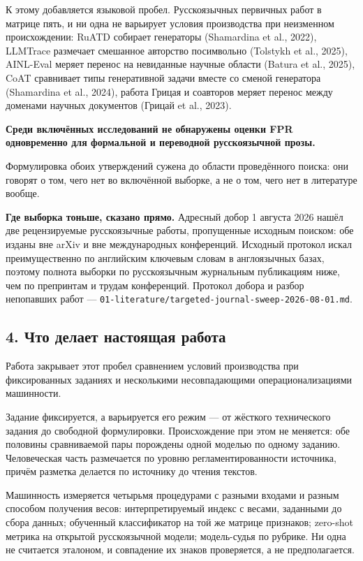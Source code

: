 \documentclass[11pt,a4paper]{article}
\renewcommand{\_}{\textunderscore\allowbreak}
\begin{document}
К этому добавляется языковой пробел. Русскоязычных первичных работ в матрице пять,
и ни одна не варьирует условия производства при неизменном происхождении: RuATD
собирает генераторы (Shamardina et al., 2022), LLMTrace размечает смешанное авторство посимвольно
(Tolstykh et al., 2025), AINL-Eval меряет перенос на невиданные научные области (Batura et al., 2025), CoAT
сравнивает типы генеративной задачи вместе со сменой генератора (Shamardina et al., 2024), работа
Грицая и соавторов меряет перенос между доменами научных документов (Грицай et al., 2023).

\textbf{Среди включённых исследований не обнаружены оценки FPR одновременно для
формальной и переводной русскоязычной прозы.}

Формулировка обоих утверждений сужена до области проведённого поиска: они говорят
о том, чего нет во включённой выборке, а не о том, чего нет в литературе вообще.

\textbf{Где выборка тоньше, сказано прямо.} Адресный добор 1 августа 2026 нашёл две
рецензируемые русскоязычные работы, пропущенные исходным поиском: обе изданы вне
arXiv и вне международных конференций. Исходный протокол искал преимущественно по
английским ключевым словам в англоязычных базах, поэтому полнота выборки по
русскоязычным журнальным публикациям ниже, чем по препринтам и трудам конференций.
Протокол добора и разбор непопавших работ — \texttt{01-\allowbreak{}literature/targeted-\allowbreak{}journal-\allowbreak{}sweep-\allowbreak{}2026-\allowbreak{}08-\allowbreak{}01.md}.

\subsection{4. Что делает настоящая работа}

Работа закрывает этот пробел сравнением условий производства при фиксированных
заданиях и несколькими несовпадающими операционализациями машинности.

Задание фиксируется, а варьируется его режим — от жёсткого технического задания
до свободной формулировки. Происхождение при этом не меняется: обе половины
сравниваемой пары порождены одной моделью по одному заданию. Человеческая часть
размечается по уровню регламентированности источника, причём разметка делается по
источнику до чтения текстов.

Машинность измеряется четырьмя процедурами с разными входами и разным способом
получения весов: интерпретируемый индекс с весами, заданными до сбора данных;
обученный классификатор на той же матрице признаков; zero-shot метрика на
открытой русскоязычной модели; модель-судья по рубрике. Ни одна не считается
эталоном, и совпадение их знаков проверяется, а не предполагается.
\end{document}

